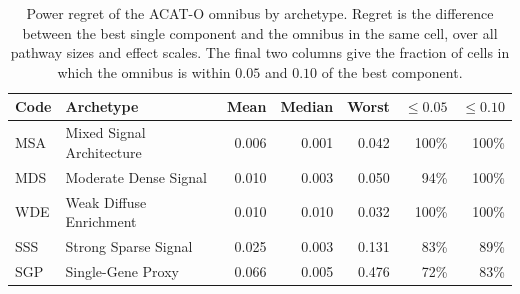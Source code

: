 \begin{table}[!htbp]
\centering
\caption{Power regret of the ACAT-O omnibus by archetype. Regret is the difference between the best single component and the omnibus in the same cell, over all pathway sizes and effect scales. The final two columns give the fraction of cells in which the omnibus is within $0.05$ and $0.10$ of the best component.}
\label{tab:archregret}
\small
\begin{tabular*}{\linewidth}{@{\extracolsep{\fill}}llrrrrr}
\hline
\textbf{Code} & \textbf{Archetype} & \textbf{Mean} & \textbf{Median} & \textbf{Worst} & \textbf{$\le0.05$} & \textbf{$\le0.10$} \\
\hline
MSA & Mixed Signal Architecture & 0.006 & 0.001 & 0.042 & 100\% & 100\% \\
MDS & Moderate Dense Signal & 0.010 & 0.003 & 0.050 & 94\% & 100\% \\
WDE & Weak Diffuse Enrichment & 0.010 & 0.010 & 0.032 & 100\% & 100\% \\
SSS & Strong Sparse Signal & 0.025 & 0.003 & 0.131 & 83\% & 89\% \\
SGP & Single-Gene Proxy & 0.066 & 0.005 & 0.476 & 72\% & 83\% \\
\hline
\end{tabular*}
\end{table}

